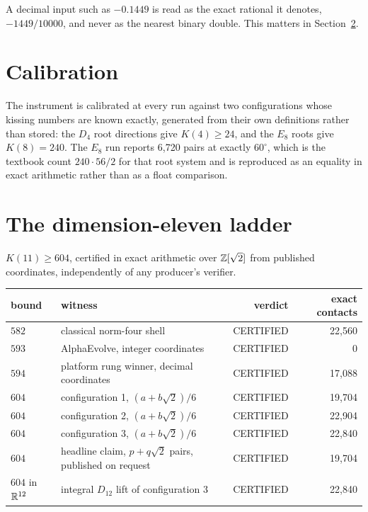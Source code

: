 \documentclass[11pt]{article}
\begin{document}
A decimal input such as $-0.1449$ is read as the exact rational it denotes,
$-1449/10000$, and never as the nearest binary double. This matters in
Section~\ref{sec:ladder}.

\section{Calibration}

The instrument is calibrated at every run against two configurations whose
kissing numbers are known exactly, generated from their own definitions rather
than stored: the $D_4$ root directions give $K(4) \ge 24$, and the $E_8$
roots give $K(8) = 240$. The $E_8$ run reports 6,720 pairs at
exactly $60^\circ$, which is the textbook count $240 \cdot 56/2$ for that root
system and is reproduced as an equality in exact arithmetic rather than as a
float comparison.

\section{The dimension-eleven ladder}\label{sec:ladder}

\begin{theorem}
$K(11) \ge 604$, certified in exact arithmetic over $\mathbb{Z}[\sqrt2]$ from published
coordinates, independently of any producer's verifier.
\end{theorem}

\begin{table}[h]\centering\small
\begin{tabular}{@{}llrr@{}}
\toprule
bound & witness & verdict & exact contacts \\
\midrule
$582$ & classical norm-four shell & CERTIFIED & 22,560 \\
$593$ & AlphaEvolve, integer coordinates & CERTIFIED & 0 \\
$594$ & platform rung winner, decimal coordinates & CERTIFIED & 17,088 \\
$604$ & configuration 1, $(a+b\sqrt2)/6$ & CERTIFIED & 19,704 \\
$604$ & configuration 2, $(a+b\sqrt2)/6$ & CERTIFIED & 22,904 \\
$604$ & configuration 3, $(a+b\sqrt2)/6$ & CERTIFIED & 22,840 \\
$604$ & headline claim, $p+q\sqrt2$ pairs, published on request & CERTIFIED & 19,704 \\
\midrule
$604$ in $\mathbb{R}^{12}$ & integral $D_{12}$ lift of configuration 3 & CERTIFIED & 22,840 \\
\bottomrule
\end{tabular}
\end{table}
\end{document}
